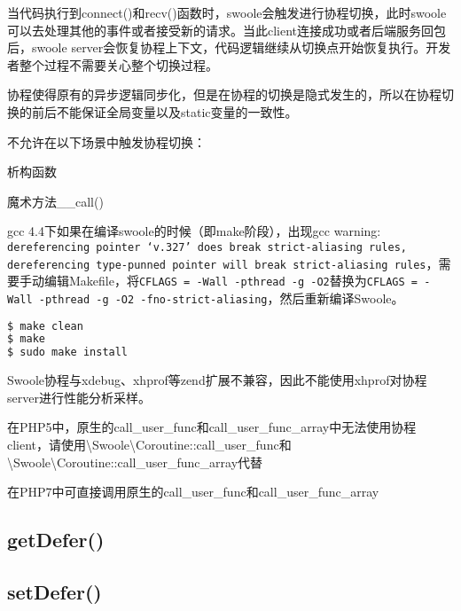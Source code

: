 当代码执行到connect()和recv()函数时，swoole会触发进行协程切换，此时swoole可以去处理其他的事件或者接受新的请求。当此client连接成功或者后端服务回包后，swoole server会恢复协程上下文，代码逻辑继续从切换点开始恢复执行。开发者整个过程不需要关心整个切换过程。


协程使得原有的异步逻辑同步化，但是在协程的切换是隐式发生的，所以在协程切换的前后不能保证全局变量以及static变量的一致性。


不允许在以下场景中触发协程切换：

\begin{compactitem}
\item 析构函数
\item 魔术方法\_\_call()
\end{compactitem}

gcc 4.4下如果在编译swoole的时候（即make阶段），出现gcc warning: \texttt{dereferencing pointer ‘v.327’ does break strict-aliasing rules, dereferencing type-punned pointer will break strict-aliasing rules}，需要手动编辑Makefile，将\texttt{CFLAGS = -Wall -pthread -g -O2}替换为\texttt{CFLAGS = -Wall -pthread -g -O2 -fno-strict-aliasing}，然后重新编译Swoole。


\begin{lstlisting}[language=bash]
$ make clean
$ make
$ sudo make install
\end{lstlisting}

Swoole协程与xdebug、xhprof等zend扩展不兼容，因此不能使用xhprof对协程server进行性能分析采样。


\begin{compactitem}
\item 在PHP5中，原生的call\_user\_func和call\_user\_func\_array中无法使用协程client，请使用\textbackslash Swoole\textbackslash Coroutine::call\_user\_func和\textbackslash Swoole\textbackslash Coroutine::call\_user\_func\_array代替
\item 在PHP7中可直接调用原生的call\_user\_func和call\_user\_func\_array
\end{compactitem}


\subsection{getDefer()}






\subsection{setDefer()}




